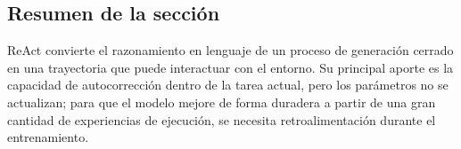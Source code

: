 \subsection{Resumen de la sección}

ReAct convierte el razonamiento en lenguaje de un proceso de generación cerrado en una trayectoria que puede interactuar con el entorno. Su principal aporte es la capacidad de autocorrección dentro de la tarea actual, pero los parámetros no se actualizan; para que el modelo mejore de forma duradera a partir de una gran cantidad de experiencias de ejecución, se necesita retroalimentación durante el entrenamiento.
